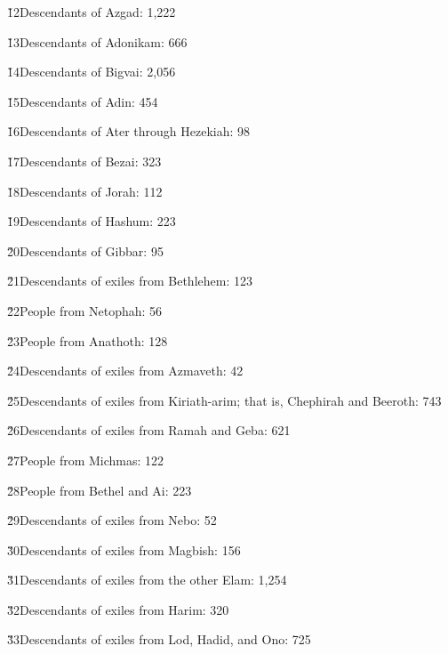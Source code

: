 \v{12}Descendants of Azgad: 1,222

\v{13}Descendants of Adonikam: 666

\v{14}Descendants of Bigvai: 2,056

\v{15}Descendants of Adin: 454

\v{16}Descendants of Ater through Hezekiah: 98

\v{17}Descendants of Bezai: 323

\v{18}Descendants of Jorah: 112

\v{19}Descendants of Hashum: 223

\v{20}Descendants of Gibbar: 95

\v{21}Descendants of exiles from Bethlehem: 123

\v{22}People from Netophah: 56

\v{23}People from Anathoth: 128

\v{24}Descendants of exiles from Azmaveth: 42

\v{25}Descendants of exiles from Kiriath-arim; that is, Chephirah and Beeroth: 743

\v{26}Descendants of exiles from Ramah and Geba: 621

\v{27}People from Michmas: 122

\v{28}People from Bethel and Ai: 223

\v{29}Descendants of exiles from Nebo: 52

\v{30}Descendants of exiles from Magbish: 156

\v{31}Descendants of exiles from the other Elam: 1,254

\v{32}Descendants of exiles from Harim: 320

\v{33}Descendants of exiles from Lod, Hadid, and Ono: 725

